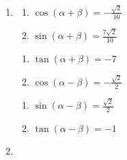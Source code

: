 \begin{enumerate}

\setcounter{enumi}{\value{HW}}

\item \begin{multicols}{2}

\begin{enumerate}

\item  $\cos(\alpha + \beta) = -\frac{\sqrt{2}}{10}$
\item  $\sin(\alpha + \beta) = \frac{7\sqrt{2}}{10}$

\setcounter{HWindent}{\value{enumii}}

\end{enumerate}

\end{multicols}

\begin{multicols}{2}

\begin{enumerate}

\setcounter{enumii}{\value{HWindent}}

\item  $\tan(\alpha + \beta) = -7$ 
\item  $\cos(\alpha - \beta)= -\frac{\sqrt{2}}{2}$

\setcounter{HWindent}{\value{enumii}}

\end{enumerate}

\end{multicols}

\begin{multicols}{2}

\begin{enumerate}

\setcounter{enumii}{\value{HWindent}}

\item  $\sin(\alpha - \beta) = \frac{\sqrt{2}}{2}$
\item  $\tan(\alpha - \beta) = -1$ 

\end{enumerate}

\end{multicols}

\item \begin{multicols}{2}

\begin{enumerate}


\end{enumerate}
\end{multicols}
\end{enumerate}
